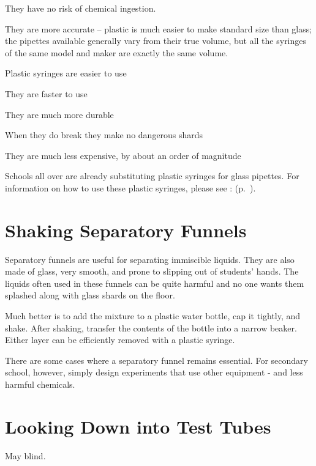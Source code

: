 \begin{itemize*}
\item They have no risk of chemical ingestion. 
\item They are more accurate – 
plastic is much easier to make standard size than glass; 
the pipettes available generally vary from their true volume, 
but all the syringes of the same model 
and maker are exactly the same volume. 
\item Plastic syringes are easier to use
\item They are faster to use
\item They are much more durable
\item When they do break they make no dangerous shards
\item They are much less expensive, 
by about an order of magnitude
\end{itemize*}
Schools all over are already substituting plastic syringes for glass pipettes.
For information on how to use these plastic syringes, 
please see :  (p.~\pageref{cha:usesyringe}).

\section{Shaking Separatory Funnels}

Separatory funnels are useful for separating immiscible liquids. 
They are also made of glass, 
very smooth, 
and prone to slipping out of students' hands. 
The liquids often used in these funnels 
can be quite harmful and no one wants them 
splashed along with glass shards on the floor.

Much better is to add the mixture to a plastic water bottle, 
cap it tightly, 
and shake. 
After shaking, 
transfer the contents of the bottle into a narrow beaker. 
Either layer can be efficiently removed with a plastic syringe.

There are some cases where a separatory funnel remains essential. 
For secondary school, 
however, 
simply design experiments that use other equipment - 
and less harmful chemicals.

\section{Looking Down into Test Tubes}
May blind.

